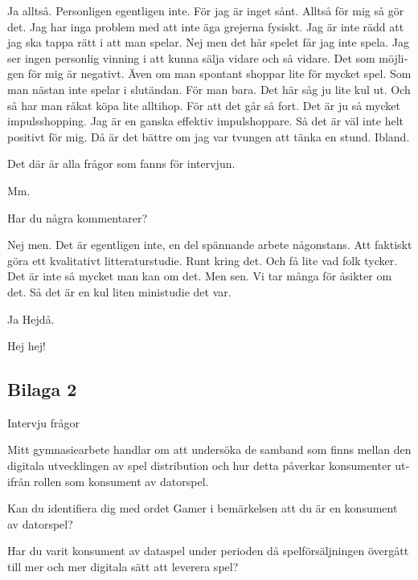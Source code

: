 \documentclass[11p]{article}
\begin{document}
\begin{otherlanguage}{swedish}
        Ja alltså. Personligen egentligen inte. För jag är inget sånt. Alltså för mig så gör det.
        Jag har inga problem med att inte äga grejerna fysiskt. Jag är inte rädd att jag ska tappa rätt i att man spelar. Nej men det här spelet får jag inte spela.
        Jag ser ingen personlig vinning i att kunna sälja vidare och så vidare. Det som möjligen för mig är negativt. Även om man spontant shoppar lite för mycket spel.
        Som man nästan inte spelar i slutändan. För man bara. Det här såg ju lite kul ut. Och så har man råkat köpa lite alltihop. För att det går så fort. Det är ju så mycket impulsshopping. Jag är en ganska effektiv impulshoppare.
        Så det är väl inte helt positivt för mig. Då är det bättre om jag var tvungen att tänka en stund. Ibland.


        \setlength{\leftskip}{0cm}
        Det där är alla frågor som fanns för intervjun.

        \setlength{\leftskip}{1cm}

        Mm.

        \setlength{\leftskip}{0cm}
        Har du några kommentarer?

        \setlength{\leftskip}{1cm}
        Nej men. Det är egentligen inte, en del spännande arbete någonstans. Att faktiskt göra ett kvalitativt litteraturstudie.
        Runt kring det. Och få lite vad folk tycker. Det är inte så mycket man kan om det. Men sen. Vi tar många för åsikter om det. Så det är en kul liten ministudie det var.




        \setlength{\leftskip}{0cm}
        Ja Hejdå.


        \setlength{\leftskip}{1cm}
        Hej hej!

        \setlength{\leftskip}{0cm}

        \subsection{Bilaga 2}
        Intervju frågor

        Mitt gymnasiearbete handlar om att undersöka de samband som finns mellan den digitala utvecklingen av spel distribution och hur detta påverkar konsumenter utifrån rollen som konsument av datorspel.

        Kan du identifiera dig med ordet Gamer i bemärkelsen att du är en konsument av datorspel?

        Har du varit konsument av dataspel under perioden då spelförsäljningen övergått till mer och mer digitala sätt att leverera spel?


\end{otherlanguage}
\end{document}
